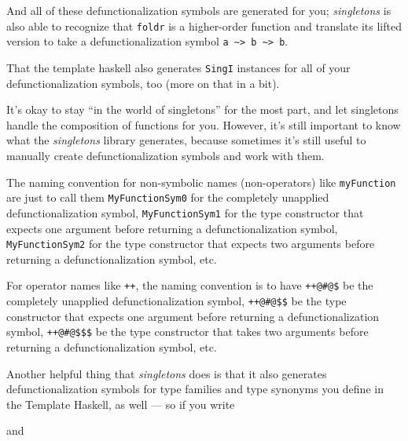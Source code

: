 \documentclass[]{article}
\newenvironment{Shaded}{}{}
\newcommand{\NormalTok}[1]{#1}
\newcommand{\OperatorTok}[1]{\textcolor[rgb]{0.40,0.40,0.40}{#1}}
\begin{document}
And all of these defunctionalization symbols are generated for you;
\emph{singletons} is also able to recognize that \texttt{foldr} is a
higher-order function and translate its lifted version to take a
defunctionalization symbol
\texttt{a\ \textasciitilde{}\textgreater{}\ b\ \textasciitilde{}\textgreater{}\ b}.

That the template haskell also generates \texttt{SingI} instances for all of
your defunctionalization symbols, too (more on that in a bit).

It's okay to stay ``in the world of singletons'' for the most part, and let
singletons handle the composition of functions for you. However, it's still
important to know what the \emph{singletons} library generates, because
sometimes it's still useful to manually create defunctionalization symbols and
work with them.

The naming convention for non-symbolic names (non-operators) like
\texttt{myFunction} are just to call them \texttt{MyFunctionSym0} for the
completely unapplied defunctionalization symbol, \texttt{MyFunctionSym1} for the
type constructor that expects one argument before returning a
defunctionalization symbol, \texttt{MyFunctionSym2} for the type constructor
that expects two arguments before returning a defunctionalization symbol, etc.

For operator names like \texttt{++}, the naming convention is to have
\texttt{++@\#@\$} be the completely unapplied defunctionalization symbol,
\texttt{++@\#@\$\$} be the type constructor that expects one argument before
returning a defunctionalization symbol, \texttt{++@\#@\$\$\$} be the type
constructor that takes two arguments before returning a defunctionalization
symbol, etc.

Another helpful thing that \emph{singletons} does is that it also generates
defunctionalization symbols for type families and type synonyms you define in
the Template Haskell, as well --- so if you write

\begin{Shaded}
\end{Shaded}

and
\end{document}
